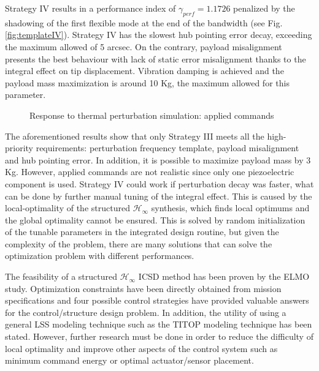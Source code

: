 \documentclass{ifacconf}
\begin{document}
Strategy IV results in a performance index of $\gamma_{perf} = 1.1726$ penalized by the shadowing of the first flexible mode at the end of the bandwidth (see Fig. \ref{fig:templateIV}). Strategy IV has the slowest hub pointing error decay, exceeding the maximum allowed of 5 arcsec. On the contrary, payload misalignment presents the best behaviour with lack of static error misalignment thanks to the integral effect on tip displacement. Vibration damping is achieved and the payload mass maximization is around 10 Kg, the maximum allowed for this parameter.


\begin{figure}[]
\centering
{}
\hfill
{} 
\hfill
{}
\caption{Response to thermal perturbation simulation: applied commands}
\label{fig:simulationCommands}
\end{figure}

The aforementioned results show that only Strategy III meets all the high-priority requirements: perturbation frequency template, payload misalignment and hub pointing error. In addition, it is possible to maximize payload mass by 3 Kg. However, applied commands are not realistic since only one piezoelectric component is used. Strategy IV could work if perturbation decay was faster, what can be done by further manual tuning of the integral effect. This is caused by the local-optimality of the structured $\mathcal{H}_\infty$ synthesis, which finds local optimums and the global optimality cannot be ensured. This is solved by random initialization of the tunable parameters \citep{Gahinet2011_Hinf} in the integrated design routine, but given the complexity of the problem, there are many solutions that can solve the optimization problem with different performances.

The feasibility of a structured $\mathcal{H}_\infty$ ICSD method has been proven by the ELMO study. Optimization constraints have been directly obtained from mission specifications and four possible control strategies have provided valuable answers for the control/structure design problem. In addition, the utility of using a general LSS modeling technique such as the TITOP modeling technique has been stated. However, further research must be done in order to reduce the difficulty of local optimality and improve other aspects of the control system such as minimum command energy or optimal actuator/sensor placement.
 
\end{document}
